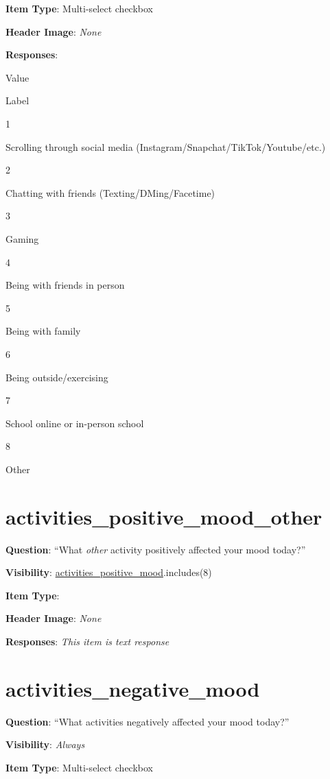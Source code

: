 \documentclass[]{book}
\begin{document}
\textbf{Item Type}: Multi-select checkbox

\textbf{Header Image}: \emph{None}

\textbf{Responses}:

Value

Label

1

Scrolling through social media (Instagram/Snapchat/TikTok/Youtube/etc.)

2

Chatting with friends (Texting/DMing/Facetime)

3

Gaming

4

Being with friends in person

5

Being with family

6

Being outside/exercising

7

School online or in-person school

8

Other

\hypertarget{activities_positive_mood_other}{%
\section{activities\_positive\_mood\_other}\label{activities_positive_mood_other}}

\textbf{Question}: ``What \emph{other} activity positively affected your mood today?''

\textbf{Visibility}: \protect\hyperlink{activities_positive_mood}{activities\_positive\_mood}.includes(8)

\textbf{Item Type}:

\textbf{Header Image}: \emph{None}

\textbf{Responses}: \emph{This item is text response}

\hypertarget{activities_negative_mood}{%
\section{activities\_negative\_mood}\label{activities_negative_mood}}

\textbf{Question}: ``What activities negatively affected your mood today?''

\textbf{Visibility}: \emph{Always}

\textbf{Item Type}: Multi-select checkbox
\end{document}
